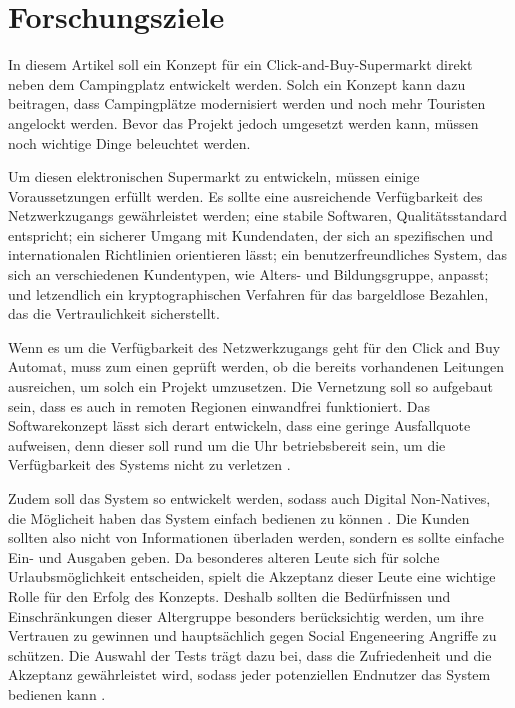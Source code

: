 \section{Forschungsziele}


In diesem Artikel soll ein Konzept für ein Click-and-Buy-Supermarkt direkt neben dem Campingplatz 
entwickelt werden. Solch ein Konzept kann dazu beitragen, dass Campingplätze modernisiert werden 
und noch mehr Touristen angelockt werden. Bevor das Projekt jedoch umgesetzt werden kann, müssen 
noch wichtige Dinge beleuchtet werden. 

Um diesen elektronischen Supermarkt zu entwickeln, müssen einige Voraussetzungen erfüllt werden.
Es sollte eine ausreichende Verfügbarkeit des Netzwerkzugangs gewährleistet werden; eine stabile 
Softwaren, Qualitätsstandard entspricht; ein sicherer Umgang mit Kundendaten, der sich an spezifischen 
und internationalen Richtlinien orientieren lässt; ein benutzerfreundliches System, das sich an 
verschiedenen Kundentypen, wie Alters- und Bildungsgruppe, anpasst; und letzendlich ein kryptographischen
Verfahren für das bargeldlose Bezahlen, das die Vertraulichkeit sicherstellt.


Wenn es um die Verfügbarkeit des Netzwerkzugangs geht für den Click and Buy Automat, muss zum einen 
geprüft werden, ob die bereits vorhandenen Leitungen ausreichen, um solch ein Projekt umzusetzen. Die
Vernetzung soll so aufgebaut sein, dass es auch in remoten Regionen einwandfrei funktioniert. Das
Softwarekonzept lässt sich derart entwickeln, dass eine geringe Ausfallquote aufweisen, denn dieser soll
rund um die Uhr betriebsbereit sein, um die Verfügbarkeit des Systems nicht zu verletzen \cite{refbook:SWIS}.


Zudem soll das System so entwickelt werden, sodass auch Digital Non-Natives, die Möglicheit 
haben das System einfach bedienen zu können \cite{refart:QWDN}. Die Kunden sollten also nicht von 
Informationen überladen werden, sondern es sollte einfache Ein- und Ausgaben geben. Da besonderes alteren
Leute sich für solche Urlaubsmöglichkeit entscheiden, spielt die Akzeptanz dieser Leute eine wichtige
Rolle für den Erfolg des Konzepts. Deshalb sollten die Bedürfnissen und Einschränkungen dieser Altergruppe
besonders berücksichtig werden, um ihre Vertrauen zu gewinnen \cite{refart:HLAU} und hauptsächlich
gegen Social Engeneering Angriffe zu schützen. Die Auswahl der Tests trägt dazu bei, dass die Zufriedenheit 
und die Akzeptanz gewährleistet wird, sodass jeder potenziellen Endnutzer das System bedienen kann 
\cite{refbook:IASE}.

